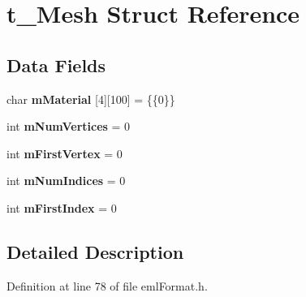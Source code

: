 \hypertarget{structt___mesh}{}\section{t\+\_\+\+Mesh Struct Reference}
\label{structt___mesh}
\subsection*{Data Fields}
\begin{DoxyCompactItemize}
\item 
char {\bfseries m\+Material} \mbox{[}4\mbox{]}\mbox{[}100\mbox{]} = \{\{0\}\}\hypertarget{structt___mesh_a4a82c6d4286a7df34c4dc28229c402b4}{}\label{structt___mesh_a4a82c6d4286a7df34c4dc28229c402b4}

\item 
int {\bfseries m\+Num\+Vertices} = 0\hypertarget{structt___mesh_ae51da38315ca5cec3cd5f8ac8a1f072d}{}\label{structt___mesh_ae51da38315ca5cec3cd5f8ac8a1f072d}

\item 
int {\bfseries m\+First\+Vertex} = 0\hypertarget{structt___mesh_a8134e592c5bbfb7cff8fe3e7ec7712dc}{}\label{structt___mesh_a8134e592c5bbfb7cff8fe3e7ec7712dc}

\item 
int {\bfseries m\+Num\+Indices} = 0\hypertarget{structt___mesh_a77c3917779b385020887bb415d45a8ce}{}\label{structt___mesh_a77c3917779b385020887bb415d45a8ce}

\item 
int {\bfseries m\+First\+Index} = 0\hypertarget{structt___mesh_ae9b0dd2e167c2f4f558263b32812f2b2}{}\label{structt___mesh_ae9b0dd2e167c2f4f558263b32812f2b2}

\end{DoxyCompactItemize}


\subsection{Detailed Description}


Definition at line 78 of file eml\+Format.\+h.

